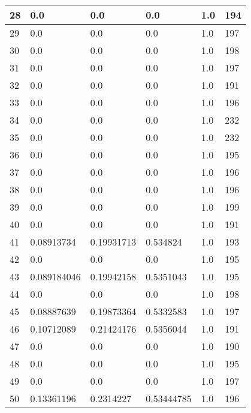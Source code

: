 \begin{longtable}{|l|l|l|l|l|l|}
28 & 0.0 & 0.0 & 0.0 & 1.0 & 194 \\ \hline 
29 & 0.0 & 0.0 & 0.0 & 1.0 & 197 \\ \hline 
30 & 0.0 & 0.0 & 0.0 & 1.0 & 198 \\ \hline 
31 & 0.0 & 0.0 & 0.0 & 1.0 & 197 \\ \hline 
32 & 0.0 & 0.0 & 0.0 & 1.0 & 191 \\ \hline 
33 & 0.0 & 0.0 & 0.0 & 1.0 & 196 \\ \hline 
34 & 0.0 & 0.0 & 0.0 & 1.0 & 232 \\ \hline 
35 & 0.0 & 0.0 & 0.0 & 1.0 & 232 \\ \hline 
36 & 0.0 & 0.0 & 0.0 & 1.0 & 195 \\ \hline 
37 & 0.0 & 0.0 & 0.0 & 1.0 & 196 \\ \hline 
38 & 0.0 & 0.0 & 0.0 & 1.0 & 196 \\ \hline 
39 & 0.0 & 0.0 & 0.0 & 1.0 & 199 \\ \hline 
40 & 0.0 & 0.0 & 0.0 & 1.0 & 191 \\ \hline 
41 & 0.08913734 & 0.19931713 & 0.534824 & 1.0 & 193 \\ \hline 
42 & 0.0 & 0.0 & 0.0 & 1.0 & 195 \\ \hline 
43 & 0.089184046 & 0.19942158 & 0.5351043 & 1.0 & 195 \\ \hline 
44 & 0.0 & 0.0 & 0.0 & 1.0 & 198 \\ \hline 
45 & 0.08887639 & 0.19873364 & 0.5332583 & 1.0 & 197 \\ \hline 
46 & 0.10712089 & 0.21424176 & 0.5356044 & 1.0 & 191 \\ \hline 
47 & 0.0 & 0.0 & 0.0 & 1.0 & 190 \\ \hline 
48 & 0.0 & 0.0 & 0.0 & 1.0 & 195 \\ \hline 
49 & 0.0 & 0.0 & 0.0 & 1.0 & 197 \\ \hline 
50 & 0.13361196 & 0.2314227 & 0.53444785 & 1.0 & 196 \\ \hline 
\end{longtable}